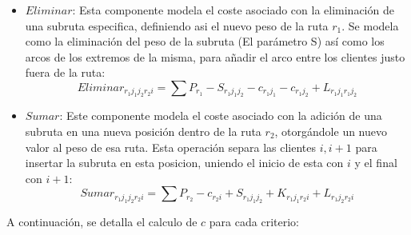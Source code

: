 \documentclass{article}
\begin{document}
\begin{itemize}
\item {$Eliminar$: Esta componente modela el coste asociado con la eliminación de una subruta especifica, definiendo asi el nuevo peso de la ruta $r_1$. Se modela como la eliminación del peso de la subruta (El parámetro S) así como los arcos de los extremos de la misma, para añadir el arco entre los clientes justo fuera de la ruta:}
\[
Eliminar_{r_1j_1j_2r_2i}=\sum P_{r_1}-S_{{r_1}{j_1}{j_2}}-c_{{r_1}{j_1}}-c_{{r_1}{j_2}}+L_{{r_1}{j_1}{r_1}{j_2}}
\]
\item {$Sumar$: Este componente modela el coste asociado con la adición de una subruta en una nueva posición dentro de la ruta $r_2$, otorgándole un nuevo valor al peso de esa ruta. Esta operación separa las clientes $i,i+1$ para insertar la subruta en esta posicion, uniendo el inicio de esta con $i$ y el final con $i+1$:}
 \[
Sumar_{r_1j_1j_2r_2i}=\sum  P_{r_2} - c_{{r_2}{i}} + S_{{r_1}{j_1}{j_2}}+K_{{r_1}{j_1}{r_2}{i}} + L_{{r_1}{j_2}{r_2}{i}}
\] 
\end{itemize}
A continuación, se detalla el calculo de $c$ para cada criterio:
\end{document}
